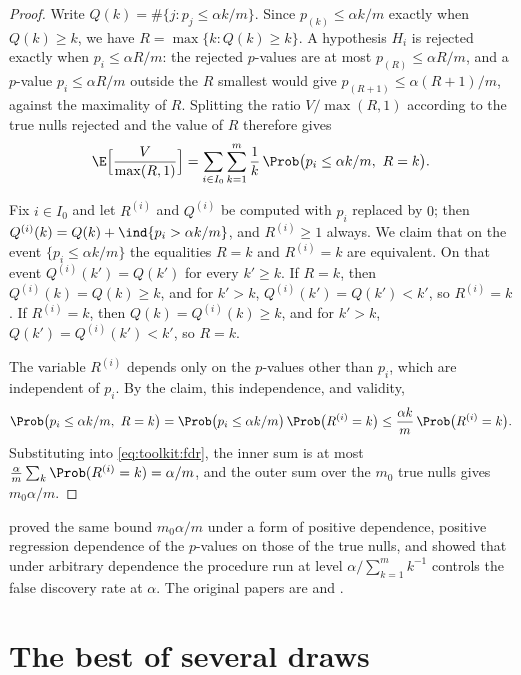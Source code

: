 \begin{refsection}
\begin{proof}
Write $Q(k)=\#\{j:p_j\le\alpha k/m\}$. Since $p_{(k)}\le\alpha k/m$ exactly when $Q(k)\ge k$, we have $R=\max\{k:Q(k)\ge k\}$. A hypothesis $H_i$ is rejected exactly when $p_i\le\alpha R/m$: the rejected $p$-values are at most $p_{(R)}\le\alpha R/m$, and a $p$-value $p_i\le\alpha R/m$ outside the $R$ smallest would give $p_{(R+1)}\le\alpha(R+1)/m$, against the maximality of $R$. Splitting the ratio $V/\max(R,1)$ according to the true nulls rejected and the value of $R$ therefore gives
\begin{equation}\label{eq:toolkit:fdr}
\E\Bigl[\frac{V}{\max(R,1)}\Bigr]=\sum_{i\in I_0}\sum_{k=1}^m\frac1k\,\Prob\bigl(p_i\le\alpha k/m,\ R=k\bigr).
\end{equation}

Fix $i\in I_0$ and let $R^{(i)}$ and $Q^{(i)}$ be computed with $p_i$ replaced by $0$; then $Q^{(i)}(k)=Q(k)+\ind\{p_i>\alpha k/m\}$, and $R^{(i)}\ge1$ always. We claim that on the event $\{p_i\le\alpha k/m\}$ the equalities $R=k$ and $R^{(i)}=k$ are equivalent. On that event $Q^{(i)}(k')=Q(k')$ for every $k'\ge k$. If $R=k$, then $Q^{(i)}(k)=Q(k)\ge k$, and for $k'>k$, $Q^{(i)}(k')=Q(k')<k'$, so $R^{(i)}=k$. If $R^{(i)}=k$, then $Q(k)=Q^{(i)}(k)\ge k$, and for $k'>k$, $Q(k')=Q^{(i)}(k')<k'$, so $R=k$.

The variable $R^{(i)}$ depends only on the $p$-values other than $p_i$, which are independent of $p_i$. By the claim, this independence, and validity,
\[
\Prob\bigl(p_i\le\alpha k/m,\ R=k\bigr)=\Prob\bigl(p_i\le\alpha k/m\bigr)\,\Prob\bigl(R^{(i)}=k\bigr)\le\frac{\alpha k}m\,\Prob\bigl(R^{(i)}=k\bigr).
\]
Substituting into \eqref{eq:toolkit:fdr}, the inner sum is at most $\frac\alpha m\sum_k\Prob(R^{(i)}=k)=\alpha/m$, and the outer sum over the $m_0$ true nulls gives $m_0\alpha/m$.
\end{proof}

\Textcite{BenjaminiYekutieli2001} proved the same bound $m_0\alpha/m$ under a form of positive dependence, positive regression dependence of the $p$-values on those of the true nulls, and showed that under arbitrary dependence the procedure run at level $\alpha/\sum_{k=1}^m k^{-1}$ controls the false discovery rate at $\alpha$. The original papers are \textcite{Holm1979} and \textcite{BenjaminiHochberg1995}.

\section{The best of several draws}\label{sec:toolkit:orderstat}


\end{refsection}
